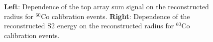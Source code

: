 \documentclass[a4paper,11pt]{article}
\begin{document}
\begin{figure}[htbp]
  \begin{minipage}[ht]{0.49\linewidth}    
  \end{minipage}
  \hfill
  \begin{minipage}[ht]{0.49\linewidth}  
  \end{minipage}
	\caption{\textbf{Left}: Dependence of the top array sum signal on the reconstructed radius for $^{60}$Co calibration events.
 \textbf{Right}: Dependence of the reconstructed S2 energy on the reconstructed radius for $^{60}$Co calibration events.}
	\label{img:energy_vs_r}
\end{figure}
\end{document}
